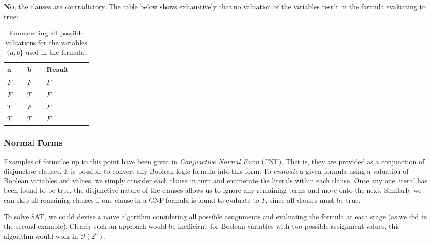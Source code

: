 \documentclass[a4paper,openany,12pt]{book}
\begin{document}
\textcolor{id7-ruby-red}{\textbf{No}}, the clauses are contradictory. The table below shows exhaustively that no valuation of the variables result in the formula evaluating to true:

\def\arraystretch{1.5}%
\begin{table}[H]
	\centering
	\begin{tabular}[t]{|p{0.05\linewidth}|p{0.05\linewidth}|p{0.1\linewidth}|}
		\hline
		\rowcolor{id7-aubergine}
		{\color[HTML]{FFFFFF} $\mathbf{a}$} & {\color[HTML]{FFFFFF} $\mathbf{b}$} & {\color[HTML]{FFFFFF} \sffamily  \textbf{Result}} \\ \hline
		$F$ & $F$ & $F$  \\ \hline
		$F$ & $T$ & $F$  \\ \hline
		$T$ & $F$ & $F$  \\ \hline
		$T$ & $T$ & $F$  \\ \hline
	\end{tabular}
	\caption{Enumerating all possible valuations for the variables $\{a, b\}$ used in the formula.}
	\label{table:landingredesign}
\end{table}

\subsubsection{Normal Forms}

Examples of formulae up to this point have been given in \emph{Conjunctive Normal Form} (CNF). That is, they are provided as a conjunction of disjunctive clauses. It is possible to convert any Boolean logic formula into this form. To \emph{evaluate} a given formula using a valuation of Boolean variables and values, we simply consider each clause in turn and enumerate the literals within each clause. Once any one literal has been found to be true, the disjunctive nature of the clauses allows us to ignore any remaining terms and move onto the next. Similarly we can skip all remaining clauses if one clause in a CNF formula is found to evaluate to $F$, since all clauses must be true.

To solve SAT, we could devise a naïve algorithm considering all possible assignments and evaluating the formula at each stage (as we did in the second example). Clearly such an approach would be inefficient--for Boolean variables with two possible assignment values, this algorithm would work in $\mathcal{O}(2^n)$.
\end{document}
